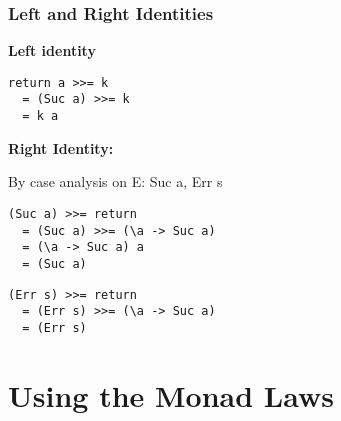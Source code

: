\documentclass{beamer}
\begin{document}
\begin{frame}[fragile]
\frametitle{Left and Right Identities}
\textbf{Left identity}
\begin{lstlisting}
return a >>= k 
  = (Suc a) >>= k 
  = k a
\end{lstlisting}


\textbf{Right Identity:}\pause

By case analysis on E: Suc a, Err s
\begin{lstlisting}
(Suc a) >>= return 
  = (Suc a) >>= (\a -> Suc a)
  = (\a -> Suc a) a
  = (Suc a)
\end{lstlisting}\pause
\begin{lstlisting}
(Err s) >>= return
  = (Err s) >>= (\a -> Suc a)
  = (Err s)
\end{lstlisting}
\end{frame}



\section{Using the Monad Laws}
\end{document}
